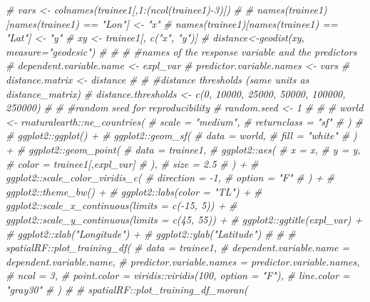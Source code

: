 \documentclass[
]{article}
\newenvironment{Shaded}{\begin{snugshade}}{\end{snugshade}}
\newcommand{\CommentTok}[1]{\textcolor[rgb]{0.56,0.35,0.01}{\textit{#1}}}
\begin{document}
\begin{Shaded}
\begin{Highlighting}[]
\CommentTok{\# vars \textless{}{-} colnames(trainee1[,1:(ncol(trainee1){-}3)])}
\CommentTok{\# }
\CommentTok{\# names(trainee1)[names(trainee1) == "Lon"] \textless{}{-} "x"}
\CommentTok{\# names(trainee1)[names(trainee1) == "Lat"] \textless{}{-} "y"}
\CommentTok{\# xy \textless{}{-} trainee1[, c("x", "y")]}
\CommentTok{\# distance\textless{}{-}geodist(xy, measure="geodesic")}
\CommentTok{\# }
\CommentTok{\# \# \#names of the response variable and the predictors}
\CommentTok{\# dependent.variable.name \textless{}{-} expl\_var}
\CommentTok{\# predictor.variable.names \textless{}{-} vars}
\CommentTok{\# distance.matrix \textless{}{-} distance}
\CommentTok{\# }
\CommentTok{\# \#distance thresholds (same units as distance\_matrix)}
\CommentTok{\# distance.thresholds \textless{}{-} c(0, 10000, 25000, 50000, 100000, 250000)}
\CommentTok{\# }
\CommentTok{\# \#random seed for reproducibility}
\CommentTok{\# random.seed \textless{}{-} 1}
\CommentTok{\# }
\CommentTok{\# }
\CommentTok{\# world \textless{}{-} rnaturalearth::ne\_countries(}
\CommentTok{\#   scale = "medium", }
\CommentTok{\#   returnclass = "sf"}
\CommentTok{\# )}
\CommentTok{\# }
\CommentTok{\# ggplot2::ggplot() +}
\CommentTok{\#   ggplot2::geom\_sf(}
\CommentTok{\#     data = world, }
\CommentTok{\#     fill = "white"}
\CommentTok{\#   ) +}
\CommentTok{\#   ggplot2::geom\_point(}
\CommentTok{\#     data = trainee1,}
\CommentTok{\#     ggplot2::aes(}
\CommentTok{\#       x = x,}
\CommentTok{\#       y = y,}
\CommentTok{\#       color = trainee1[,expl\_var]}
\CommentTok{\#     ),}
\CommentTok{\#     size = 2.5}
\CommentTok{\#   ) +}
\CommentTok{\#   ggplot2::scale\_color\_viridis\_c(}
\CommentTok{\#     direction = {-}1, }
\CommentTok{\#     option = "F"}
\CommentTok{\#   ) +}
\CommentTok{\#   ggplot2::theme\_bw() +}
\CommentTok{\#   ggplot2::labs(color = "TL") +}
\CommentTok{\#   ggplot2::scale\_x\_continuous(limits = c({-}15, 5)) +}
\CommentTok{\#   ggplot2::scale\_y\_continuous(limits = c(45, 55))  +}
\CommentTok{\#   ggplot2::ggtitle(expl\_var) + }
\CommentTok{\#   ggplot2::xlab("Longitude") + }
\CommentTok{\#   ggplot2::ylab("Latitude")}
\CommentTok{\# }
\CommentTok{\# }
\CommentTok{\# spatialRF::plot\_training\_df(}
\CommentTok{\#   data = trainee1,}
\CommentTok{\#   dependent.variable.name = dependent.variable.name,}
\CommentTok{\#   predictor.variable.names = predictor.variable.names,}
\CommentTok{\#   ncol = 3,}
\CommentTok{\#   point.color = viridis::viridis(100, option = "F"),}
\CommentTok{\#   line.color = "gray30"}
\CommentTok{\# )}
\CommentTok{\# }
\CommentTok{\# spatialRF::plot\_training\_df\_moran(}

\end{Highlighting}
\end{Shaded}
\end{document}
